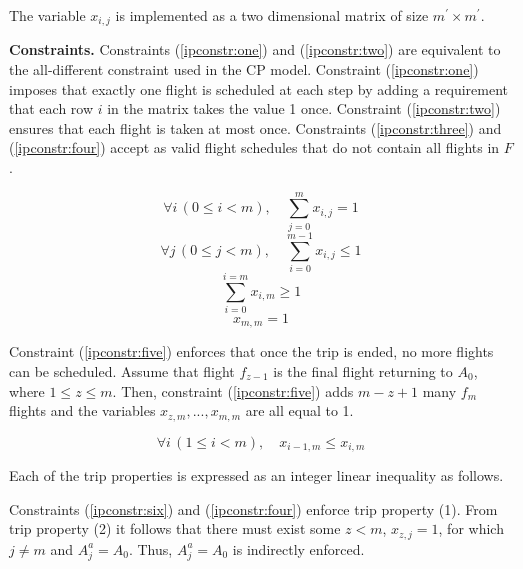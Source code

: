 \documentclass{mpaper}
\begin{document}
The variable $x_{i,j}$ is implemented as a two dimensional matrix of size $m^\prime \times m^\prime$.

\textbf{Constraints.} Constraints (\ref{ipconstr:one}) and (\ref{ipconstr:two}) are equivalent to the all-different constraint used in the CP model. Constraint (\ref{ipconstr:one}) imposes that exactly one flight is scheduled at each step by adding a requirement that each row $i$ in the matrix takes the value 1 once. Constraint (\ref{ipconstr:two}) ensures that each flight is taken at most once. Constraints (\ref{ipconstr:three}) and (\ref{ipconstr:four}) accept as valid flight schedules that do not contain all flights in $F$.

\vspace{-2mm}
\begin{equation}
\label{ipconstr:one}
\forall i \, (0 \leq i < m), \quad \sum^{m}_{j = 0} x_{i,j} = 1
\end{equation}
\vspace{-1mm}
\begin{equation}
\label{ipconstr:two}
\forall j \, (0 \leq j < m), \quad \sum^{m-1}_{i = 0}x_{i,j} \leq 1
\end{equation}
\vspace{-1mm}
\begin{equation}
\label{ipconstr:three}
\sum_{i=0}^{i = m} x_{i,m} \geq 1
\end{equation}
\vspace{-1mm}
\begin{equation}
\label{ipconstr:four}
x_{m,m} = 1
\end{equation}
\vspace{-1mm}

Constraint (\ref{ipconstr:five}) enforces that once the trip is ended, no more flights can be scheduled. Assume that flight $f_{z-1}$ is the final flight returning to $A_{0}$, where $1 \leq z \leq m$. Then, constraint (\ref{ipconstr:five}) adds $m-z+1$ many $f_{m}$ flights and the variables $x_{z,m},...,x_{m,m}$ are all equal to 1.

\vspace{-1mm}
\begin{equation}
\label{ipconstr:five}
\forall i \, (1 \leq i < m), \quad x_{i-1,m} \leq x_{i,m}
\end{equation}
\vspace{-1mm}

Each of the trip properties is expressed as an integer linear inequality as follows.

Constraints (\ref{ipconstr:six}) and (\ref{ipconstr:four}) enforce trip property (1). From trip property (2) it follows that there must exist some $z < m$, $x_{z,j} = 1$, for which $j \neq m$ and $A^{a}_{j} = A_{0}$. Thus, $A^{a}_{j} = A_{0}$ is indirectly enforced.
\end{document}
